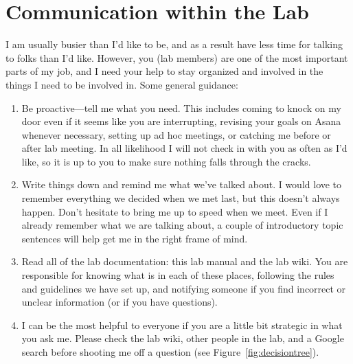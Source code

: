 \documentclass[letterpaper,11pt,oneside]{memoir}
\begin{document}
\section{Communication within the Lab}
\label{sec:communicationInLab}

I am usually busier than I'd like to be, and as a result have less time for talking to folks than I'd like. However, you (lab members) are one of the most important parts of my job, and I need your help to stay organized and involved in the things I need to be involved in. Some general guidance:

\begin{enumerate}
\item Be proactive---tell me what you need. This includes coming to knock on my door even if it seems like you are interrupting, revising your goals on Asana whenever necessary, setting up ad hoc meetings, or catching me before or after lab meeting. In all likelihood I will not check in with you as often as I'd like, so it is up to you to make sure nothing falls through the cracks.
\item Write things down and remind me what we've talked about. I would love to remember everything we decided when we met last, but this doesn't always happen. Don't hesitate to bring me up to speed when we meet. Even if I already remember what we are talking about, a couple of introductory topic sentences will help get me in the right frame of mind.
\item Read all of the lab documentation: this lab manual and the lab wiki. You are responsible for knowing what is in each of these places, following the rules and guidelines we have set up, and notifying someone if you find incorrect or unclear information (or if you have questions).
\item I can be the most helpful to everyone if you are a little bit strategic in what you ask me. Please check the lab wiki, other people in the lab, and a Google search before shooting me off a question (see Figure~\ref{fig:decisiontree}).
\end{enumerate}
\end{document}
